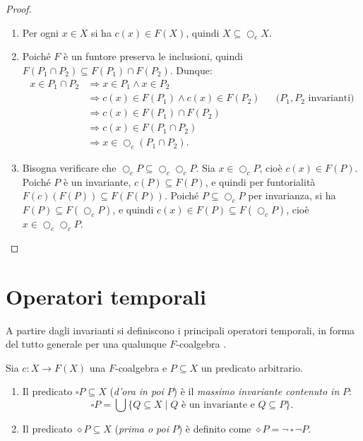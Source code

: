 \begin{proof}
  \begin{enumerate}
    \item Per ogni \(x \in X\) si ha \(c(x) \in F(X)\), quindi \(X \subseteq \bigcirc_c X\).
    \item Poiché \(F\) è un funtore preserva le inclusioni, quindi \(F(P_1 \cap P_2) \subseteq F(P_1) \cap F(P_2)\). Dunque:
          \[
            \begin{aligned}
              x \in P_1 \cap P_2 & \Longrightarrow x \in P_1 \wedge x \in P_2                                                   \\
                                 & \Longrightarrow c(x) \in F(P_1) \wedge c(x) \in F(P_2) &  & \text{(\(P_1, P_2\) invarianti)} \\
                                 & \Longrightarrow c(x) \in F(P_1) \cap F(P_2)                                                  \\
                                 & \Longrightarrow c(x) \in F(P_1 \cap P_2)                                                     \\
                                 & \Longrightarrow x \in \bigcirc_c(P_1 \cap P_2).
            \end{aligned}
          \]
    \item Bisogna verificare che \(\bigcirc_c P \subseteq \bigcirc_c \bigcirc_c P\). Sia \(x \in \bigcirc_c P\), cioè \(c(x) \in F(P)\). Poiché \(P\) è un invariante, \(c(P) \subseteq F(P)\), e quindi per funtorialità \(F(c)(F(P)) \subseteq F(F(P))\). Poiché \(P \subseteq \bigcirc_c P\) per invarianza, si ha \(F(P) \subseteq F(\bigcirc_c P)\), e quindi \(c(x) \in F(P) \subseteq F(\bigcirc_c P)\), cioè \(x \in \bigcirc_c \bigcirc_c P\).
  \end{enumerate}
\end{proof}

\section{Operatori temporali}

A partire dagli invarianti si definiscono i principali operatori temporali, in forma del tutto generale per una qualunque \(F\)-coalgebra \cite{jacobs2017}.

\begin{definition}
  Sia \(c : X \to F(X)\) una \(F\)-coalgebra e \(P \subseteq X\) un predicato arbitrario.
  \begin{enumerate}
    \item Il predicato \(\square P \subseteq X\) (\textit{d'ora in poi} \(P\)) è il \textit{massimo invariante contenuto in} \(P\):
          \[
            \square P = \bigcup \{Q \subseteq X \mid Q \text{ è un invariante e } Q \subseteq P\}.
          \]
    \item Il predicato \(\diamond P \subseteq X\) (\textit{prima o poi} \(P\)) è definito come \(\diamond P = \neg\,\square\,\neg P\).
  \end{enumerate}
\end{definition}

